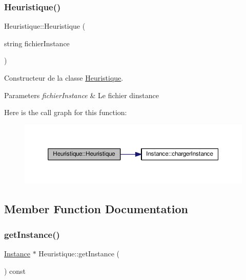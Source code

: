 \subsubsection{\texorpdfstring{Heuristique()}{Heuristique()}}
{\footnotesize\ttfamily Heuristique\+::\+Heuristique (\begin{DoxyParamCaption}\item[{string}]{fichier\+Instance }\end{DoxyParamCaption})}



Constructeur de la classe \hyperlink{classHeuristique}{Heuristique}. 


\begin{DoxyParams}{Parameters}
{\em fichier\+Instance} & Le fichier d\textquotesingle{}instance \\
\hline
\end{DoxyParams}
Here is the call graph for this function\+:\nopagebreak
\begin{figure}[H]
\begin{center}
\leavevmode
\includegraphics[width=350pt]{classHeuristique_a58630433c6bac8eec9a5888945eba479_cgraph}
\end{center}
\end{figure}


\subsection{Member Function Documentation}
\mbox{\label{classHeuristique_aa84c0d4d8d2ff50462bc7e77079818e4}} 
\subsubsection{\texorpdfstring{get\+Instance()}{getInstance()}}
{\footnotesize\ttfamily \hyperlink{classInstance}{Instance} $\ast$ Heuristique\+::get\+Instance (\begin{DoxyParamCaption}{ }\end{DoxyParamCaption}) const}

